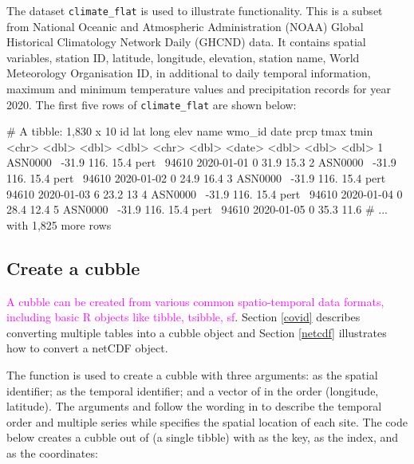 \documentclass[
]{jss}
\begin{document}
The dataset \texttt{climate\_flat} is used to illustrate  functionality. This is a subset from National Oceanic and Atmospheric Administration (NOAA) Global Historical Climatology Network Daily (GHCND) data. It contains spatial variables, station ID, latitude, longitude, elevation, station name, World Meteorology Organisation ID, in additional to daily temporal information, maximum and minimum temperature values and precipitation records for year 2020. The first five rows of \texttt{climate\_flat} are shown below:

\begin{CodeChunk}
\begin{CodeOutput}
# A tibble: 1,830 x 10
  id         lat  long  elev name  wmo_id date        prcp  tmax  tmin
  <chr>    <dbl> <dbl> <dbl> <chr>  <dbl> <date>     <dbl> <dbl> <dbl>
1 ASN0000~ -31.9  116.  15.4 pert~  94610 2020-01-01     0  31.9  15.3
2 ASN0000~ -31.9  116.  15.4 pert~  94610 2020-01-02     0  24.9  16.4
3 ASN0000~ -31.9  116.  15.4 pert~  94610 2020-01-03     6  23.2  13  
4 ASN0000~ -31.9  116.  15.4 pert~  94610 2020-01-04     0  28.4  12.4
5 ASN0000~ -31.9  116.  15.4 pert~  94610 2020-01-05     0  35.3  11.6
# ... with 1,825 more rows
\end{CodeOutput}
\end{CodeChunk}

\hypertarget{create}{%
\subsection{Create a cubble}\label{create}}

\textcolor{magenta}{A cubble can be created from various common spatio-temporal data formats, including basic R objects like tibble, tsibble, sf}. Section \ref{covid} describes converting multiple tables into a cubble object and Section \ref{netcdf} illustrates how to convert a netCDF object.

The function  is used to create a cubble with three arguments:  as the spatial identifier;  as the temporal identifier; and a vector of  in the order (longitude, latitude). The arguments  and  follow the wording in  to describe the temporal order and multiple series while  specifies the spatial location of each site. The code below creates a cubble out of  (a single tibble) with  as the key,  as the index, and  as the coordinates:
\end{document}
